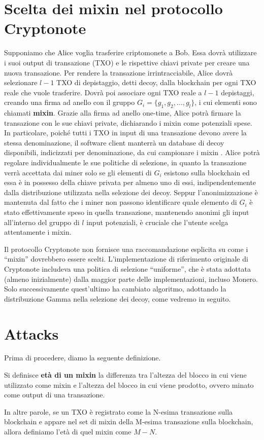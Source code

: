 \section{Scelta dei mixin nel protocollo Cryptonote}
Supponiamo che Alice voglia trasferire criptomonete a Bob. Essa dovrà utilizzare i suoi output di transazione (TXO) e le rispettive chiavi private per creare una nuova transazione. Per rendere la transazione irrintracciabile, Alice dovrà selezionare \(l-1\) TXO di depistaggio, detti decoy, dalla blockchain per ogni TXO reale che vuole trasferire. Dovrà poi associare ogni TXO reale a \(l-1\) depistaggi, creando una firma ad anello con il gruppo \(G_i = \{g_1, g_2, \ldots, g_l\}\), i cui elementi sono chiamati \textbf{mixin}. Grazie alla firma ad anello one-time, Alice potrà firmare la transazione con le sue chiavi private, dichiarando i mixin come potenziali spese.
In particolare, poiché tutti i TXO in input di una transazione devono avere la stessa denominazione, il software client manterrà un database di decoy disponibili, indicizzati per denominazione, da cui campionare i mixin . Alice potrà regolare individualmente le sue politiche di selezione, in quanto la transazione verrà accettata dai miner solo se gli elementi di \(G_i\) esistono sulla blockchain ed essa è in possesso della chiave privata per almeno uno di essi, indipendentemente dalla distribuzione utilizzata nella selezione dei decoy. 
Seppur l'anonimizzazione è mantenuta dal fatto che i miner non passono identificare quale elemento di \(G_i\) è stato effettivamente speso in quella transazione, mantenendo anonimi gli input all'interno del gruppo di \(l\) input potenziali, è cruciale che l'utente scelga attentamente i mixin.

Il protocollo Cryptonote non fornisce una raccomandazione esplicita su come i “mixin” dovrebbero essere scelti. L'implementazione di riferimento originale di Cryptonote includeva una politica di selezione “uniforme”, che è stata adottata (almeno inizialmente) dalla maggior parte delle implementazioni, incluso Monero. Solo successivamente quest'ultimo ha cambiato algoritmo, adottando la distribuzione Gamma nella selezione dei decoy, come vedremo in seguito.

\section{Attacks}

Prima di procedere, diamo la seguente definizione.

\begin{definition}
Si definisce \textbf{età di un mixin} la differenza tra l'altezza del blocco in cui viene utilizzato come mixin e l'altezza del blocco in cui viene prodotto, ovvero minato come output di una transazione. 
\end{definition}
In altre parole, se un TXO è registrato come la N-esima transazione sulla blockchain e appare nel set di mixin della M-esima transazione sulla blockchain, allora definiamo l'età di quel mixin come \( M - N \).


